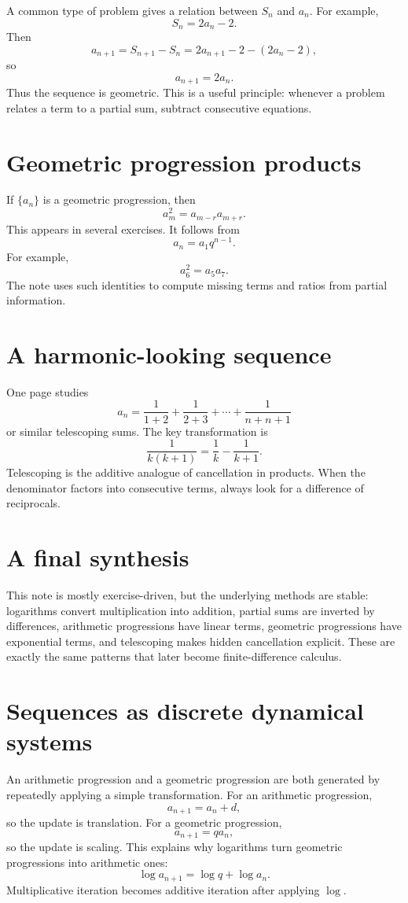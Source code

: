 A common type of problem gives a relation between \(S_n\) and \(a_n\).  For example,
\[
  S_n=2a_n-2.
\]
Then
\[
  a_{n+1}=S_{n+1}-S_n=2a_{n+1}-2-(2a_n-2),
\]
so
\[
  a_{n+1}=2a_n.
\]
Thus the sequence is geometric.  This is a useful principle: whenever a problem relates a term to a partial sum, subtract consecutive equations.

\section{Geometric progression products}

If \(\{a_n\}\) is a geometric progression, then
\[
  a_m^2=a_{m-r}a_{m+r}.
\]
This appears in several exercises.  It follows from
\[
  a_n=a_1q^{n-1}.
\]
For example,
\[
  a_6^2=a_5a_7.
\]
The note uses such identities to compute missing terms and ratios from partial information.

\section{A harmonic-looking sequence}

One page studies
\[
  a_n=\frac1{1+2}+\frac1{2+3}+\cdots+\frac1{n+n+1}
\]
or similar telescoping sums.  The key transformation is
\[
  \frac1{k(k+1)}=\frac1k-\frac1{k+1}.
\]
Telescoping is the additive analogue of cancellation in products.  When the denominator factors into consecutive terms, always look for a difference of reciprocals.

\section{A final synthesis}

This note is mostly exercise-driven, but the underlying methods are stable: logarithms convert multiplication into addition, partial sums are inverted by differences, arithmetic progressions have linear terms, geometric progressions have exponential terms, and telescoping makes hidden cancellation explicit.  These are exactly the same patterns that later become finite-difference calculus.

\section{Sequences as discrete dynamical systems}

An arithmetic progression and a geometric progression are both generated by repeatedly applying a simple transformation.  For an arithmetic progression,
\[
  a_{n+1}=a_n+d,
\]
so the update is translation.  For a geometric progression,
\[
  a_{n+1}=qa_n,
\]
so the update is scaling.  This explains why logarithms turn geometric progressions into arithmetic ones:
\[
  \log a_{n+1}=\log q+\log a_n.
\]
Multiplicative iteration becomes additive iteration after applying \(\log\).

